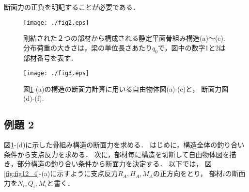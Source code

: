 ﻿\documentclass[10pt,a4j]{jbook}
\begin{document}
断面力の正負を明記することが必要である．
\begin{figure}[h]
	\begin{center}
	\texttt{[image: ./fig2.eps]} 
	\end{center}
	\caption{
		剛結された２つの部材から構成される静定平面骨組み構造(a)〜(e). 
		分布荷重の大きさは，梁の単位長さあたり$q_0$で，図中の数字1と2は部材番号を表す．
	} 
	\label{fig:fig12_2}
\end{figure}
\begin{figure}[h]
	\begin{center}
	\texttt{[image: ./fig3.eps]} 
	\end{center}
	\caption{
		図\ref{fig:fig12_2}-(a)の構造の断面力計算に用いる自由物体図(a)-(c)と，
		断面力図(d)-(f).
	} 
	\label{fig:fig12_3}
\end{figure}
\subsection{例題 2}
図\ref{fig:fig12_2}-(d)に示した骨組み構造の断面力を求める．
はじめに，構造全体の釣り合い条件から支点反力を求める．
次に，部材毎に構造を切断して自由物体図を描き，部分構造の釣り合い条件から断面力を決定する．
以下では，
図\ref{fig:fig12_4}-(a)に示すように支点反力$R_A,H_A,M_A$の正方向をとり，
部材$i$の断面力を$N_i, Q_i, M_i$と書く．
\end{document}
